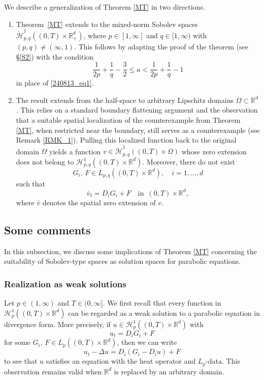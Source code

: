 \documentclass[reqno]{amsart}
\numberwithin{equation}{section}
\theoremstyle{plain}
\theoremstyle{definition}
\def\bR{\mathbb{R}}
\def\cH{\mathcal{H}}
\begin{document}
We describe a generalization of Theorem \ref{MT} in two directions.

\begin{enumerate}
    \item Theorem~\ref{MT} extends to the mixed-norm Sobolev spaces $\mathring{\cH}^1_{p,q}((0,T)\times \bR^d_+)$, where  $p\in [1, \infty]$ and $q\in [1, \infty)$ with $(p,q)\neq (\infty, 1)$.
This follows by adapting the proof of the theorem (see \S \ref{S2}) with the condition
$$
\frac{1}{2p}+\frac{1}{q}-\frac{3}{2}\le a < \frac{1}{2p}+\frac{1}{q}-1
$$
in place of \eqref{240813_eq1}.

\item The result extends from the half-space to arbitrary Lipschitz domains $\Omega \subset \bR^d$.
This relies on a standard boundary flattening argument and the observation that a suitable spatial localization of the counterexample from Theorem \ref{MT}, when restricted near the boundary, still serves as a counterexample (see Remark \ref{RMK_1}).
Pulling this localized function back to the original domain $\Omega$ yields a function $v \in \mathring{\cH}^1_{p,q}((0,T)\times \Omega)$ whose zero extension does not belong to $\cH^1_{p,q}((0,T)\times \bR^d)$.
Moreover, there do not exist 
$$
G_i, \, F\in L_{p,q}((0,T)\times \bR^d), \quad i=1,\ldots, d
$$
such that 
$$
\bar{v}_t=D_iG_i+F \quad \textrm{in }\, (0,T)\times \bR^d,
$$
where $\bar{v}$ denotes the spatial zero extension of $v$.

\end{enumerate}

\subsection{Some comments}	\label{S1_4}

In this subsection, we discuss some implications of Theorem \ref{MT} concerning the suitability of Sobolev-type spaces as solution spaces for parabolic equations.

\subsubsection{Realization as weak solutions}		\label{S1_4_1}

Let $p\in (1, \infty)$ and $T\in (0, \infty]$.
We first recall that 
every function in $\cH^1_p((0,T)\times \bR^d)$ can be regarded as a weak solution to a parabolic equation in divergence form.
More precisely, 
if $u\in \cH^1_p((0,T)\times \bR^d)$ with
$$
u_t=D_iG_i+F
$$
for some $G_i,\, F\in L_p((0,T)\times \bR^d)$, then we can write
$$
u_t-\Delta u=D_i (G_i-D_i u)+F
$$
to see that $u$ satisfies an equation with the heat operator and $L_p$-data.
This observation remains valid when $\bR^d$ is replaced by an arbitrary domain.
\end{document}
